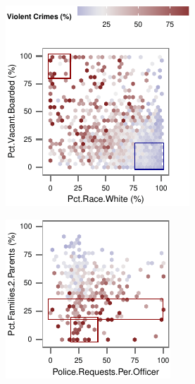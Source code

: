 \begin{figure}[t!]
    \centering
    \begin{subfigure}[b]{0.4\columnwidth}
    \includegraphics[width=\textwidth]{plots/crime1}
    \end{subfigure}
    \begin{subfigure}[b]{0.4\columnwidth}
    \includegraphics[width=\textwidth]{plots/crime2}
    \end{subfigure}


\end{figure}
